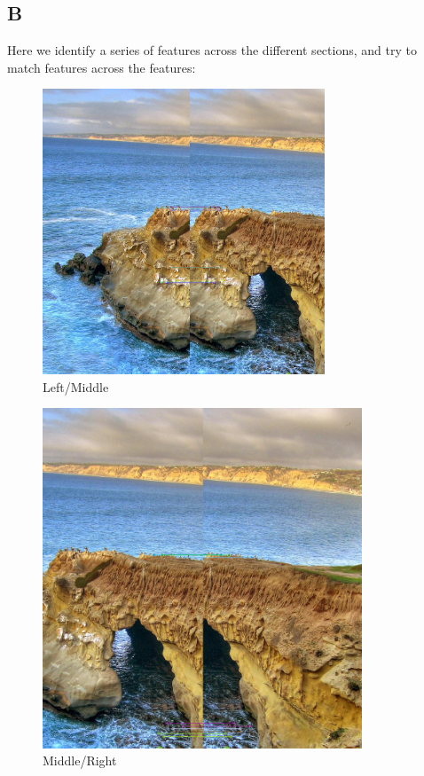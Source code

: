 \documentclass{article}
\begin{document}
\subsection*{B}

Here we identify a series of features across the different sections, and try to match features across the features:

\begin{figure}[H]
    \centering
    \includegraphics[width = 0.75\textwidth]{imgs/left-middle-matches.png}
    \caption{Left/Middle}
    \label{fig:prob1-b-left-middle}
\end{figure}

\begin{figure}[H]
    \centering
    \includegraphics[width = 0.85\textwidth]{imgs/middle-right-matches.png}
    \caption{Middle/Right}
    \label{fig:prob1-b-middle-right}
\end{figure}
\end{document}
